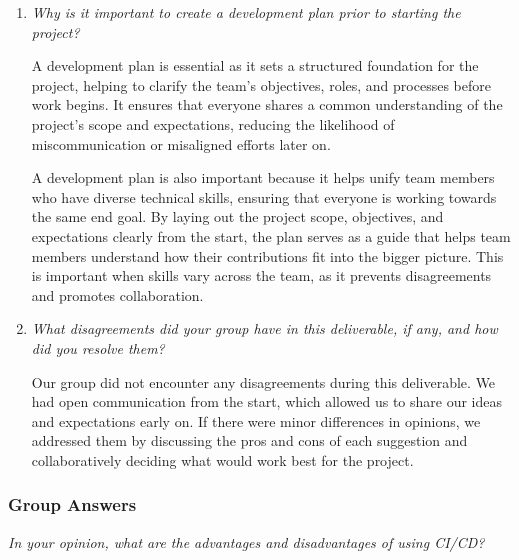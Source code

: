 \documentclass{article}
\begin{document}
\begin{enumerate}
  \item \textit{Why is it important to create a development plan prior to starting the project?}

  A development plan is essential as it sets a structured foundation for the project, helping to clarify the team's objectives, roles, and processes before work begins. It ensures that everyone shares a common understanding of the project's scope and expectations, reducing the likelihood of miscommunication or misaligned efforts later on. 

  A development plan is also important because it helps unify team members who have diverse technical skills, ensuring that everyone is working towards the same end goal. By laying out the project scope, objectives, and expectations clearly from the start, the plan serves as a guide that helps team members understand how their contributions fit into the bigger picture. This is important when skills vary across the team, as it prevents disagreements and promotes collaboration.

  \item \textit{What disagreements did your group have in this deliverable, if any, and how did you resolve them?}

  Our group did not encounter any disagreements during this deliverable. We had open communication from the start, which allowed us to share our ideas and expectations early on. If there were minor differences in opinions, we addressed them by discussing the pros and cons of each suggestion and collaboratively deciding what would work best for the project.

\end{enumerate}

\subsubsection*{Group Answers}

\textit{In your opinion, what are the advantages and disadvantages of using CI/CD?}
  
\end{document}
